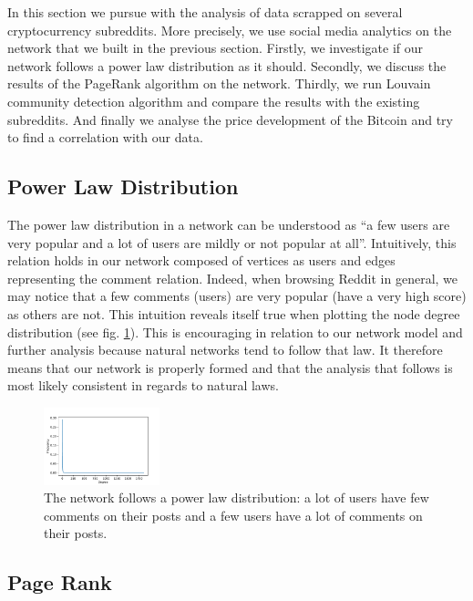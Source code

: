 In this section we pursue with the analysis of data scrapped on several cryptocurrency subreddits. More precisely, we use social media analytics on the network that we built in the previous section. Firstly, we investigate if our network follows a power law distribution as it should. Secondly, we discuss the results of the PageRank algorithm on the network. Thirdly, we run Louvain community detection algorithm and compare the results with the existing subreddits. And finally we analyse the price development of the Bitcoin and try to find a correlation with our data.

\subsection{Power Law Distribution}

The power law distribution in a network can be understood as ``a few users are very popular and a lot of users are mildly or not popular at all''. Intuitively, this relation holds in our network composed of vertices as users and edges representing the comment relation. Indeed, when browsing Reddit in general, we may notice that a few comments (users) are very popular (have a very high score) as others are not. This intuition reveals itself true when plotting the node degree distribution (see fig. \ref{fig:degdist}). This is encouraging in relation to our network model and further analysis because natural networks tend to follow that law. It therefore means that our network is properly formed and that the analysis that follows is most likely consistent in regards to natural laws.
\begin{figure}[H]
    \centering
    \includegraphics[width=0.3\textwidth]{figures/deg_dist.pdf}
    \caption{The network follows a power law distribution: a lot of users have few comments on their posts and a few users have a lot of comments on their posts.}
    \label{fig:degdist}
\end{figure}



\subsection{Page Rank}


